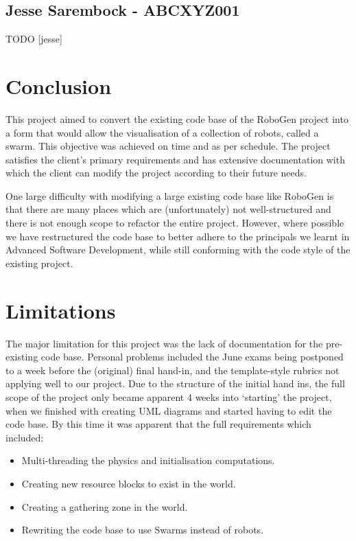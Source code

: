 \documentclass[11pt,a4paper]{article}
\begin{document}
\subsection{Jesse Sarembock - ABCXYZ001}
TODO [jesse]

\section{Conclusion}
\label{s:conclusion}
This project aimed to convert the existing code base of the RoboGen project
into a form that would allow the visualisation of a collection of robots,
called a swarm. This objective was achieved on time and as per schedule. The
project satisfies the client's primary requirements and has extensive
documentation with which the client can modify the project according to their
future needs.

One large difficulty with modifying a large existing code base like RoboGen is
that there are many places which are (unfortunately) not well-structured and
there is not enough scope to refactor the entire project. However, where
possible we have restructured the code base to better adhere to the principals
we learnt in Advanced Software Development, while still conforming with the
code style of the existing project.

\section{Limitations}
The major limitation for this project was the lack of documentation for the
pre-existing code base. Personal problems included the June exams being
postponed to a week before the (original) final hand-in, and the template-style
rubrics not applying well to our project. Due to the structure of the initial
hand ins, the full scope of the project only became apparent 4 weeks into
`starting' the project, when we finished with creating UML diagrams and started
having to edit the code base. By this time it was apparent that the full
requirements which included:

\begin{itemize}
    \item Multi-threading the physics and initialisation computations.
    \item Creating new resource blocks to exist in the world.
    \item Creating a gathering zone in the world.
    \item Rewriting the code base to use Swarms instead of robots.
\end{itemize}
\end{document}
